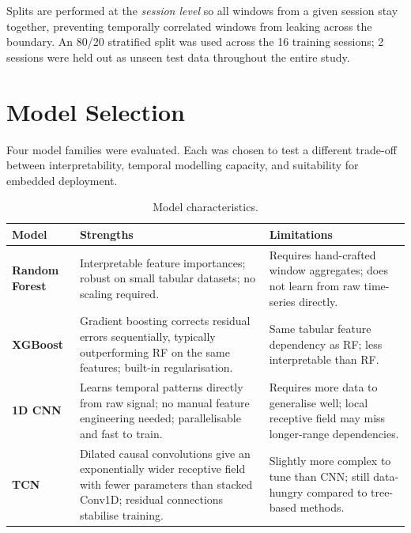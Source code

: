 \documentclass[11pt, a4paper]{article}
\begin{document}
Splits are performed at the \textit{session level} so all windows from a given
session stay together, preventing temporally correlated windows from leaking
across the boundary. An 80/20 stratified split was used across the 16 training
sessions; 2 sessions were held out as unseen test data throughout the entire study.

\section{Model Selection}

Four model families were evaluated. Each was chosen to test a different
trade-off between interpretability, temporal modelling capacity, and
suitability for embedded deployment.

\begin{table}[H]
\centering
\caption{Model characteristics.}
\begin{tabularx}{\textwidth}{lXX}
\toprule
\textbf{Model} & \textbf{Strengths} & \textbf{Limitations} \\
\midrule
\textbf{Random Forest} &
    Interpretable feature importances; robust on small tabular datasets;
    no scaling required. &
    Requires hand-crafted window aggregates; does not learn from raw
    time-series directly. \\
\addlinespace
\textbf{XGBoost} &
    Gradient boosting corrects residual errors sequentially, typically
    outperforming RF on the same features; built-in regularisation. &
    Same tabular feature dependency as RF; less interpretable than RF. \\
\addlinespace
\textbf{1D CNN} &
    Learns temporal patterns directly from raw signal; no manual feature
    engineering needed; parallelisable and fast to train. &
    Requires more data to generalise well; local receptive field
    may miss longer-range dependencies. \\
\addlinespace
\textbf{TCN} &
    Dilated causal convolutions give an exponentially wider receptive field
    with fewer parameters than stacked Conv1D; residual connections
    stabilise training. &
    Slightly more complex to tune than CNN; still data-hungry compared
    to tree-based methods. \\
\bottomrule
\end{tabularx}
\end{table}
\end{document}
